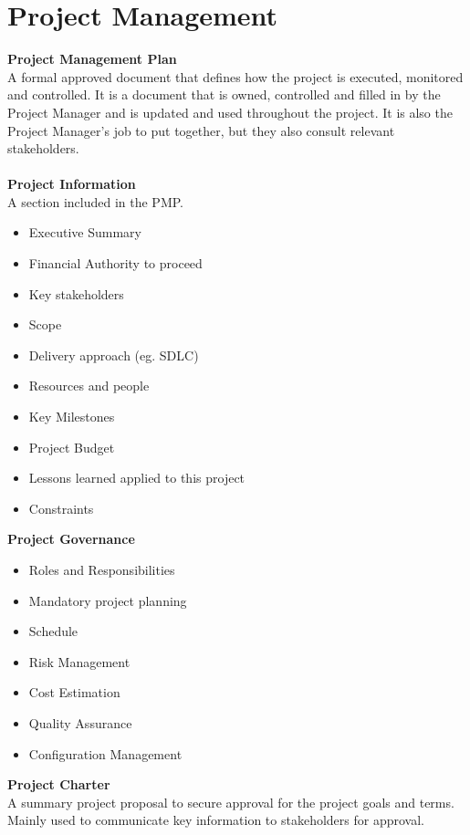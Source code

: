 \documentclass[a4paper,10pt]{article}
\begin{document}
\section*{Project Management}
\textcolor{BlueGreen}{\textbf{Project Management Plan}} \\
A formal approved document that defines how the project is executed, monitored and controlled. It is a document that is owned, controlled and filled in by the Project Manager and is updated and used throughout the project. It is also the Project Manager's job to put together, but they also consult relevant stakeholders. \\\\
\textcolor{BlueGreen}{\textbf{Project Information}} \\
A section included in the PMP. 
\begin{itemize}
	\item Executive Summary
	\item Financial Authority to proceed 
	\item Key stakeholders 
	\item Scope 
	\item Delivery approach (eg. SDLC)
	\item Resources and people 
	\item Key Milestones 
	\item Project Budget 
	\item Lessons learned applied to this project 
	\item Constraints
\end{itemize}
\textcolor{BlueGreen}{\textbf{Project Governance}}
\begin{itemize}
	\item Roles and Responsibilities 
	\item Mandatory project planning
	\item Schedule 
	\item Risk Management 
	\item Cost Estimation 
	\item Quality Assurance 
	\item Configuration Management 
\end{itemize}
\textcolor{BlueGreen}{\textbf{{Project Charter}}} \\
A summary project proposal to secure approval for the project goals and terms. Mainly used to communicate key information to stakeholders for approval. 
\newpage
\end{document}
